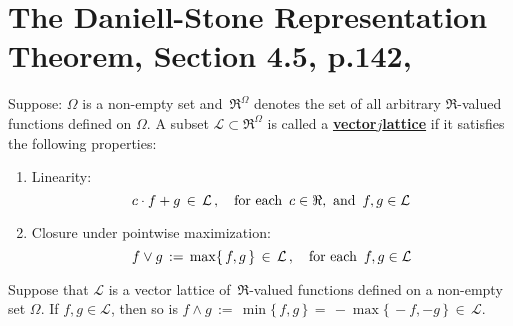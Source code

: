 

\section{The Daniell-Stone Representation Theorem, Section 4.5, p.142, \cite{Dudley2004}}
\setcounter{theorem}{0}
\setcounter{equation}{0}


\renewcommand{\theenumi}{\roman{enumi}}
\renewcommand{\labelenumi}{\textnormal{(\theenumi)}$\;\;$}


\begin{definition}
\mbox{}\vskip 0.1cm
\noindent
Suppose:\;\; $\Omega$ is a non-empty set and \,$\Re^{\Omega}$ denotes the set of all arbitrary $\Re$-valued functions
defined on $\Omega$. A subset $\mathcal{L} \subset \Re^{\Omega}$ is called a
\underline{\textbf{vector{\color{white}$j$\!}lattice}} if it satisfies the following properties:
\begin{enumerate}
\item
	Linearity:
	\begin{equation*}
	c \cdot f + g \,\in\, \mathcal{L}\,,
	\quad
	\textnormal{for each \,$c\in\Re$,\, and \,$f,g\in\mathcal{L}$}
	\end{equation*}
\item
	Closure under pointwise maximization:
	\begin{equation*}
	f \vee g \,:=\, \max\{\,f,g\,\} \,\in\, \mathcal{L}\,,
	\quad
	\textnormal{for each \,$f,g\in\mathcal{L}$}
	\end{equation*}
\end{enumerate}
\end{definition}

\begin{remark}\quad
Suppose that $\mathcal{L}$ is a vector lattice of \,$\Re$-valued functions defined on a non-empty set $\Omega$.
If $f, g \in \mathcal{L}$, then so is
$f \wedge g \,:=\, \min\{\,f,g\,\} \,=\, -\max\{\,-f,-g\,\} \,\in\, \mathcal{L}$.
\end{remark}


